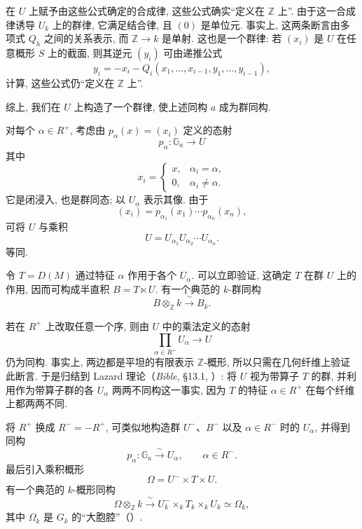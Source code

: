 在 \(U\) 上赋予由这些公式确定的合成律, 这些公式确实“定义在 \(\mathbb Z\) 上”. 由于这一合成律诱导 \(U_k\) 上的群律, 它满足结合律, 且 \((0)\) 是单位元. 事实上, 这两条断言由多项式 \(Q_h\) 之间的关系表示, 而 \(\mathbb Z\to k\) 是单射. 这也是一个群律: 若 \((x_i)\) 是 \(U\) 在任意概形 \(S\) 上的截面, 则其逆元 \((y_i)\) 可由递推公式
\[
 y_i=-x_i-Q_i(x_1,\ldots,x_{i-1},y_1,\ldots,y_{i-1}),
\]
计算, 这些公式仍“定义在 \(\mathbb Z\) 上”.

综上, 我们在 \(U\) 上构造了一个群律, 使上述同构 \(a\) 成为群同构.

对每个 \(\alpha\in R^+\), 考虑由 \(p_\alpha(x)=(x_i)\) 定义的态射
\[
 p_\alpha\colon\mathbb G_a\longrightarrow U
\]
其中
\[
 x_i=
 \begin{cases}
 x,&\alpha_i=\alpha,\\
 0,&\alpha_i\ne\alpha.
 \end{cases}
\]
它是闭浸入, 也是群同态; 以 \(U_\alpha\) 表示其像. 由于
\[
 (x_i)=p_{\alpha_1}(x_1)\cdots p_{\alpha_n}(x_n),
\]
可将 \(U\) 与乘积
\[
 U=U_{\alpha_1}U_{\alpha_2}\cdots U_{\alpha_n}.
\]
等同.


令 \(T=D(M)\) 通过特征 \(\alpha\) 作用于各个 \(U_\alpha\). 可以立即验证, 这确定 \(T\) 在群 \(U\) 上的作用, 因而可构成半直积 \(B=T\ltimes U\). 有一个典范的 \(k\)-群同构
\[
 B\otimes_{\mathbb Z}k\xrightarrow{\ \sim\ }B_k.
\]

若在 \(R^+\) 上改取任意一个序, 则由 \(U\) 中的乘法定义的态射
\[
 \prod_{\alpha\in R^+}U_\alpha\longrightarrow U
\]
仍为同构. 事实上, 两边都是平坦的有限表示 \(\mathbb Z\)-概形, 所以只需在几何纤维上验证此断言. 于是归结到 Lazard 理论（\textit{Bible}, \S13.1, ）: 将 \(U\) 视为带算子 \(T\) 的群, 并利用作为带算子群的各 \(U_\alpha\) 两两不同构这一事实, 因为 \(T\) 的特征 \(\alpha\in R^+\) 在每个纤维上都两两不同.


将 \(R^+\) 换成 \(R^-=-R^+\), 可类似地构造群 \(U^-\)、\(B^-\) 以及 \(\alpha\in R^-\) 时的 \(U_\alpha\), 并得到同构
\[
 p_\alpha\colon\mathbb G_a\xrightarrow{\ \sim\ }U_\alpha,
 \qquad \alpha\in R^-.
\]
最后引入乘积概形
\[
 \Omega=U^-\times T\times U.
\]
有一个典范的 \(k\)-概形同构
\[
 \Omega\otimes_{\mathbb Z}k
 \xrightarrow{\ \sim\ }
 U^-_k\times_kT_k\times_kU_k
 \simeq\Omega_k,
\]
其中 \(\Omega_k\) 是 \(G_k\) 的“大胞腔”（）.

